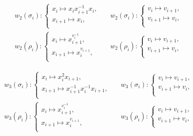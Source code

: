 \documentclass[11 pt, reqno]{amsart}
\theoremstyle{definition}
\numberwithin{equation}{subsection}
\begin{document}
\begin{align*}
&w_2(\sigma_i) :
\left\{
\begin{array}{l}
  x_i \mapsto  x_i x_{i+1}^{-1} x_i, \\
  x_{i+1} \mapsto x_i,  \\
\end{array}
\right.~~~
&w_2(\sigma_i) :
\left\{
\begin{array}{l}
  v_i \mapsto  v_{i+1}, \\
  v_{i+1} \mapsto v_i,  \\
\end{array}
\right.\\
&w_2(\rho_i) :
\left\{
\begin{array}{l}
  x_i \mapsto  x_{i+1}^{v_i^{-1}}, \\
  x_{i+1} \mapsto x_i^{v_{i+1}},  \\
\end{array}
\right.~~~
&w_2(\rho_i) :
\left\{
\begin{array}{l}
  v_i \mapsto  v_{i+1}, \\
  v_{i+1} \mapsto v_i , \\
\end{array}
\right.
\end{align*}


\begin{align*}
&w_3(\sigma_i) :
\left\{
\begin{array}{l}
  x_i \mapsto  x_i^2 x_{i+1}, \\
  x_{i+1} \mapsto x_{i+1}^{-1}x_i^{-1}x_{i+1},  \\
\end{array}
\right.~~~
&w_3(\sigma_i) :
\left\{
\begin{array}{l}
  v_i \mapsto  v_{i+1}, \\
  v_{i+1} \mapsto v_i,  \\
\end{array}
\right.\\
&w_3(\rho_i) :
\left\{
\begin{array}{l}
  x_i \mapsto  x_{i+1}^{v_i^{-1}}, \\
  x_{i+1} \mapsto x_i^{v_{i+1}},  \\
\end{array}
\right.~~~
&w_3(\rho_i) :
\left\{
\begin{array}{l}
  v_i \mapsto  v_{i+1}, \\
  v_{i+1} \mapsto v_i , \\
\end{array}
\right.
\end{align*}
\end{document}

